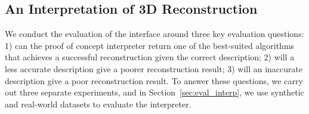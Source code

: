 \subsection{An Interpretation of 3D Reconstruction}
We conduct the evaluation of the interface around three key evaluation questions: 1) can the proof of concept interpreter return one of the best-suited algorithms that achieves a successful reconstruction given the correct description; 2) will a less accurate description give a poorer reconstruction result; 3) will an inaccurate description give a poor reconstruction result. To answer these questions, we carry out three separate experiments, and in Section~\ref{sec:eval_interp}, we use synthetic and real-world datasets to evaluate the interpreter.



